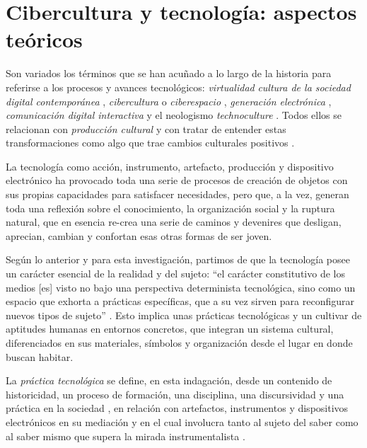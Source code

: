 \documentclass{textolivre}
\begin{document}
\section{Cibercultura y tecnología: aspectos teóricos}\label{sec-cibercultura}
Son variados los términos que se han acuñado a lo largo de la historia para referirse a los procesos y avances tecnológicos: \textit{virtualidad} \cite{levy_que_1998} \textit{cultura de la sociedad digital contemporánea} \cite{levy_educacion_1997}, \textit{cibercultura} o \textit{ciberespacio} \cite{levy_cibercultura._2007}, \textit{generación electrónica} \cite{buckingham_mas_2007}, \textit{comunicación digital interactiva} \cite{scolari_hipermediaciones._2008} y el neologismo \textit{technoculture} \cite{penley__1991}. Todos ellos se relacionan con \textit{producción cultural} \cite{baldessar_piel_2011} y con tratar de entender estas transformaciones como algo que trae cambios culturales positivos \cite{castells_sociedad_2006, eco_internet_2012, kerckhove_piel_1999, levy_cibercultura._2007}.

La tecnología como acción, instrumento, artefacto, producción y dispositivo electrónico ha provocado toda una serie de procesos de creación de objetos con sus propias capacidades para satisfacer necesidades, pero que, a la vez, generan toda una reflexión sobre el conocimiento, la organización social \cite{mejia_educaciones_2011a} y la ruptura natural, que en esencia re-crea una serie de caminos y devenires que desligan, aprecian, cambian y confortan esas otras formas de ser joven. 

Según lo anterior y para esta investigación, partimos de que la tecnología posee un carácter esencial de la realidad y del sujeto: “el carácter constitutivo de los medios [es] visto no bajo una perspectiva determinista tecnológica, sino como un espacio que exhorta a prácticas específicas, que a su vez sirven para reconfigurar nuevos tipos de sujeto” \cite[p. 4]{poster_whats_2001}. Esto implica unas prácticas tecnológicas y un cultivar de aptitudes humanas en entornos concretos, que integran un sistema cultural, diferenciados en sus materiales, símbolos y organización \cite{levy_cibercultura._2007} desde el lugar en donde buscan habitar.

La \textit{práctica tecnológica} se define, en esta indagación, desde un contenido de historicidad, un proceso de formación, una disciplina, una discursividad y una práctica en la sociedad \cite{zuluaga_garces_pedagogie_1999}, en relación con artefactos, instrumentos y dispositivos electrónicos en su mediación y en el cual involucra tanto al sujeto del saber como al saber mismo que supera la mirada instrumentalista \cite{mejia_tecnologi_2004, rios_beltran_practica_2018}.
\end{document}

